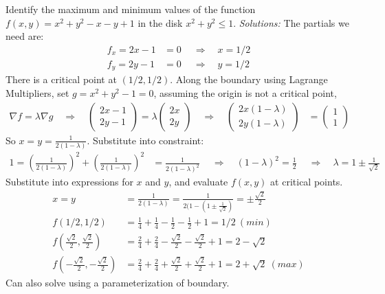 \fi



\ifnum {}

\question[4] Identify the maximum and minimum values of the function $f(x,y) = x^2 + y^2 -x -y + 1$ in the disk $x^2+y^2 \le 1$. 
\ifnum {} {\color{DarkBlue}  \textit{Solutions:} The partials we need are: 
\begin{align*}
    f_x = 2x-1 &=0 \ \quad \Rightarrow \quad x= 1/2 \\
    f_y = 2y-1 &=0 \ \quad \Rightarrow \quad y= 1/2 
\end{align*}
There is a critical point at $(1/2,1/2)$. Along the boundary using Lagrange Multipliers, set $g = x^2 + y^2 -1 = 0$, assuming the origin is not a critical point,
\begin{align*}
    \nabla f = \lambda \nabla g \quad \Rightarrow \quad 
    \begin{pmatrix} 2x-1 \\ 2y-1 \end{pmatrix} = \lambda \begin{pmatrix} 2x\\2y \end{pmatrix} \quad \Rightarrow \quad 
    \begin{pmatrix} 2x(1-\lambda) \\ 2y(1- \lambda) \end{pmatrix} &= \begin{pmatrix} 1 \\ 1 \end{pmatrix} 
\end{align*}
    So $x=y=\frac{1}{2(1-\lambda)}$. Substitute into constraint: 
    \begin{align*}
        1=(\frac{1}{2(1-\lambda)})^2 + (\frac{1}{2(1-\lambda)})^2 &= \frac{1}{2(1-\lambda)^2}\ \quad \Rightarrow \quad (1-\lambda)^2 = \frac{1}{2} \ \quad \Rightarrow \quad
        \lambda = 1 \pm \frac1{\sqrt2}
    \end{align*}
    Substitute into expressions for $x$ and $y$, and evaluate $f(x,y)$ at critical points.
    \begin{align*}
        x=y&=\frac{1}{2(1-\lambda)} = \frac{1}{2(1- ( 1 \pm \frac1{\sqrt2})} =  \pm \frac{\sqrt2}{2}\\
        f(1/2,1/2) &= \frac14+\frac14-\frac12-\frac12+1 = 1/2 \ (min)\\
        f(\frac{\sqrt2}{2},\frac{\sqrt2}{2}) &= \frac24 + \frac24 - \frac{\sqrt2}{2}-\frac{\sqrt2}{2} + 1 = 2-\sqrt2 \\
        f(-\frac{\sqrt2}{2},-\frac{\sqrt2}{2}) &= \frac24 + \frac24 + \frac{\sqrt2}{2}+\frac{\sqrt2}{2} + 1 = 2+\sqrt2 \ (max)
    \end{align*}
    Can also solve using a parameterization of boundary. 
    } 
   \else
      \vspace{8cm}
   \fi
    
